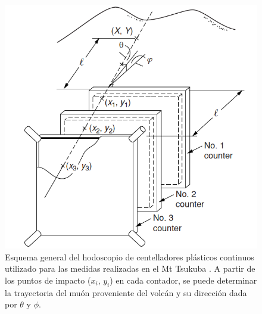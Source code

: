 \documentclass[12pt,oneside,openany,letter]{book}
\begin{document}
\begin{figure}
\begin{center}
\includegraphics[scale=0.4]{hodoscopio_general.png}
\caption[Esquema general de un hodoscopio]{Esquema general del hodoscopio de centelladores plásticos continuos utilizado para las medidas realizadas en el Mt Tsukuba \cite{nagamine_2003}. A partir de los puntos de impacto ($x_i$, $y_i$) en cada contador, se puede determinar la trayectoria del muón proveniente del volcán y su dirección dada por $\theta$ y $\phi$.}
\label{hodoscopio_general}
\end{center}
\end{figure}
\end{document}
